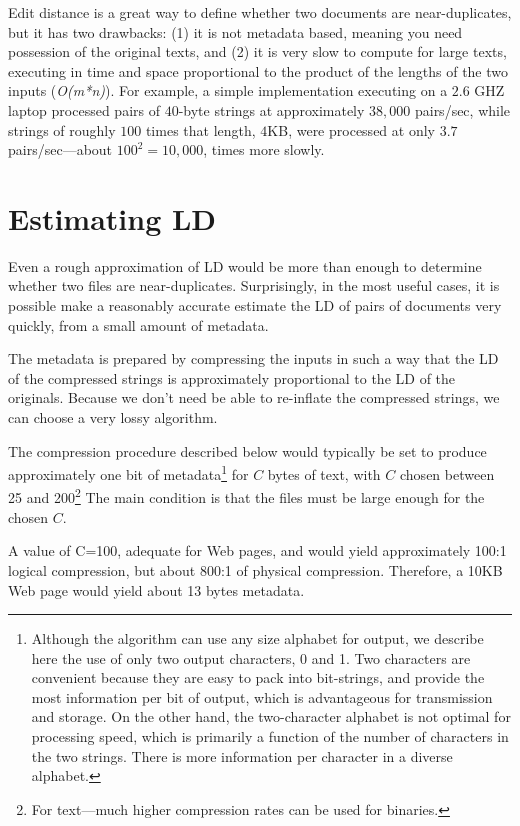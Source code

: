 \documentclass[html]{article}    %
\begin{document}
Edit distance is a great way to define whether two documents are
near-duplicates, but it has two drawbacks: (1) it is not metadata based, meaning
you need possession of the original texts, and (2) it is very slow to compute for
large texts, executing in time and space proportional to the product of the
lengths of the two inputs ({\em O(m*n)}).
For example, a simple implementation executing on a $2.6$ GHZ
laptop processed pairs of $40$-byte strings at approximately $38,000$
pairs/sec, while strings of roughly $100$ times that length, $4$KB, were processed at 
only $3.7$ pairs/sec---about $100^{2}=10,000$, times more slowly. 

\section{Estimating LD} 

Even a rough approximation of LD would be more than enough to determine whether 
two files are near-duplicates. 
Surprisingly, in the most useful cases, it is possible make a
reasonably accurate estimate the LD of pairs of documents very quickly, 
from a small amount of metadata.

The metadata is prepared by compressing the inputs in such a way that the LD of
the compressed strings is approximately proportional to the LD of the originals. 
Because we don't need be able to re-inflate the compressed strings, we
can choose a very lossy algorithm.

The compression procedure described below would typically be set to produce
approximately one bit of metadata\footnote{
Although the algorithm can use any size alphabet for output, we describe here the 
use of only two output characters, 0 and 1.
Two characters are convenient because they are easy to pack into bit-strings,
and provide the most information per bit of output, which is advantageous for 
transmission and storage.
On the other hand, the two-character alphabet is not optimal for processing speed, 
which is primarily a function of the number of characters in the two strings.
There is more information per character in a diverse alphabet.
} for $C$ bytes of text, with $C$
chosen between 25 and 200\footnote{For text---much higher compression rates can be
used for binaries.} The main condition is that the files must be large enough
for the chosen $C$.

A value of C=100, adequate for Web pages, and would yield approximately 100:1
logical compression, but about 800:1 of physical compression. 
Therefore, a 10KB Web page would yield about 13 bytes metadata.
\end{document}
